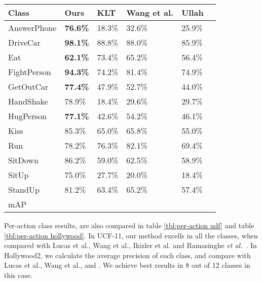 \begin{table*}[]
\centering
\caption{Per-class mAP comparison with state-of-the-art on Hollywood2.}\label{tbl:per-action hollywood}
\begin{tabular}{|l|l|l|l|l|l|}
\hline
Class            & Ours           & KLT\cite{lucas1981iterative} & Wang et al.\cite{wang2011action} & Ullah\cite{ullah2010improving}   \\ \hline \hline
AnswerPhone      & \textbf{76.6\%}& 18.3\%    & 32.6\%    & 25.9\%        \\
DriveCar         & \textbf{98.1\%}& 88.8\%    & 88.0\%    & 85.9\%     \\
Eat              & \textbf{62.1\%}& 73.4\%    & 65.2\%    & 56.4\%         \\
FightPerson      & \textbf{94.3\%}& 74.2\%    & 81.4\%    & 74.9\%         \\
GetOutCar        & \textbf{77.4\%}& 47.9\%    & 52.7\%    & 44.0\%       \\
HandShake        & 78.9\%         & 18.4\%    & 29.6\%    & 29.7\%         \\
HugPerson        & \textbf{77.1\%}& 42.6\%    & 54.2\%    & 46.1\%         \\
Kiss             & 85.3\%         & 65.0\%    & 65.8\%    & 55.0\%         \\
Run              & 78.2\%         & 76.3\%    & 82.1\%    & 69.4\%         \\
SitDown          & 86.2\%         & 59.0\%    & 62.5\%    & 58.9\%         \\
SitUp            & 75.0\%         & 27.7\%    & 20.0\%    & 18.4\%         \\
StandUp          & 81.2\%         & 63.4\%    & 65.2\%    & 57.4\%         \\ \hline
mAP              &                &           &           &          \\ \hline
\end{tabular}
\end{table*}




Per-action class results, are also compared in table \ref{tbl:per-action udf} and table \ref{tbl:per-action hollywood}. In UCF-11, our method excells
in all the classes, when compared with Lucas et al.\cite{lucas1981iterative}, Wang et al.\cite{wang2011action}, Ikizler et al.\cite{ikizler2010object}
and Ramasinghe \emph{et al.}~\cite{7486474}. In Hollywood2,
we calculate the average precision of each class, and compare with Lucas et al.\cite{lucas1981iterative}, Wang et al.\cite{wang2011action}, and \cite{}.
We achieve best results in 8 out of 12 classes in this case.






